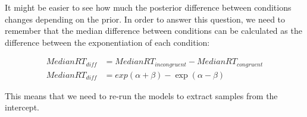 \documentclass[12pt,]{krantz}
\theoremstyle{definition}
\theoremstyle{definition}
\theoremstyle{definition}
\theoremstyle{remark}
\begin{document}
It might be easier to see how much the posterior difference between
conditions changes depending on the prior. In order to answer this
question, we need to remember that the median difference between
conditions can be calculated as the difference between the
exponentiation of each condition:

\begin{equation}
\begin{aligned}
MedianRT_{diff} &= MedianRT_{incongruent} - MedianRT_{congruent}\\
MedianRT_{diff} &= exp(\alpha + \beta) - \exp(\alpha - \beta)
\end{aligned}
\label{eq:medianrt}
\end{equation}

This means that we need to re-run the models to extract samples from the
intercept.
\end{document}
